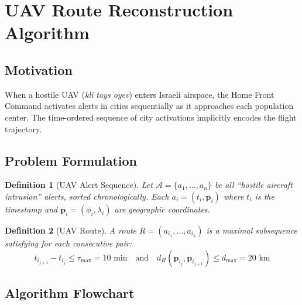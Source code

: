 \documentclass[12pt,a4paper]{article}
\newtheorem{definition}{Definition}
\newcommand{\heb}[1]{\textit{#1}}   %
\begin{document}
\section{UAV Route Reconstruction Algorithm}
\label{sec:uav}

\subsection{Motivation}
When a hostile UAV (\heb{kli tays oyev}) enters Israeli airspace, the Home Front
Command activates alerts in cities sequentially as it approaches each population
center. The time-ordered sequence of city activations implicitly encodes the flight
trajectory.

\subsection{Problem Formulation}

\begin{definition}[UAV Alert Sequence]
Let $\mathcal{A}=\{a_1,\ldots,a_n\}$ be all ``hostile aircraft intrusion'' alerts,
sorted chronologically. Each $a_i=(t_i,\mathbf{p}_i)$ where $t_i$ is the
timestamp and $\mathbf{p}_i=(\phi_i,\lambda_i)$ are geographic coordinates.
\end{definition}

\begin{definition}[UAV Route]
A route $R=(a_{i_1},\ldots,a_{i_k})$ is a maximal subsequence satisfying for each
consecutive pair:
\[
  t_{i_{j+1}}-t_{i_j}\leq\tau_{\max}=10\text{ min}
  \quad\text{and}\quad
  d_H(\mathbf{p}_{i_j},\mathbf{p}_{i_{j+1}})\leq d_{\max}=20\text{ km}
\]
\end{definition}

\subsection{Algorithm Flowchart}
\end{document}
